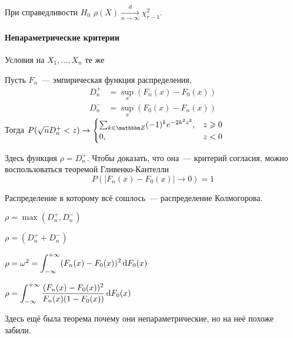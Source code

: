 \documentclass[12pt,timbord]{../../../notes}
\begin{document}
\begin{thrm}\label{thrm:stat::pirson::chi}
  При справедливости $H_0$ $\rho(X) \xrightarrow[n\to \infty]{d} \chi_{r-1}^2$.
\end{thrm}

\paragraph{Непараметрические критерии}
\label{par:stat::nonparcrit}
Условия на $X_1, \dotsc, X_n$ те же

\begin{prop}\label{prop:stat::nonparcrit::kolm}
  Пусть $F_n$~--- эмпирическая функция распределения, 
  \begin{align*}
    D_n^+ &= \sup_x (F_n(x) - F_0(x)) \\
    D_n^- &= \sup_x (F_0(x) - F_n(x)) 
  \end{align*}
  Тогда $P(\sqrt n D_n^+  < z) \to \displaystyle\begin{cases}
    \sum_{k\in \Z} (-1)^k e^{-2k^2 z^2}, &z \geqslant 0 \\
    0, &z < 0 \\
  \end{cases}$

  Здесь функция $\rho = D_n^+$. Чтобы доказать, что она~--- критерий согласия, можно
  воспользоваться теоремой Гливенко-Кантелли
  \[
    P(|F_n(x) - F_0(x) | \to 0 ) = 1
  \]

  Распределение в которому всё сошлось~--- распределение Колмогорова.
\end{prop}

\begin{prop}\label{prop:stat::nonparcrit::smir}
  $\rho = \max (D_n^+, D_n^-)$
\end{prop}
\begin{prop}\label{prop:stat::nonparcrit::koyg}
  $\rho = (D_n^+ + D_n^-)$
\end{prop}
\begin{prop}\label{prop:stat::nonparcrit::omega}
  $\rho = \omega^2  = \displaystyle\int_{-\infty}^{+\infty} (F_n(x) - F_0(x))^2 \, \mathrm{d} F_0(x)$
\end{prop}
\begin{prop}\label{prop:stat::nonparcrit::andar}
  $\rho =  \displaystyle\int_{-\infty}^{+\infty} \frac{(F_n(x) - F_0(x))^2}{F_n(x) (1-F_0(x))} \, \mathrm{d} F_0(x)$
\end{prop}

Здесь ещё была теорема почему они непараметрические, но на неё похоже забили.
\end{document}
